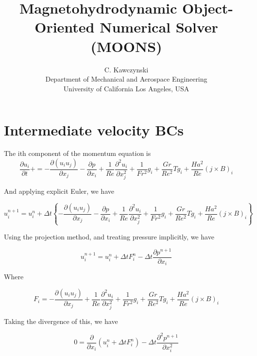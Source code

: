 \documentclass[11pt]{article}
\begin{document}
\doublespacing
\title{Magnetohydrodynamic Object-Oriented Numerical Solver (MOONS)}
\author{C. Kawczynski \\
Department of Mechanical and Aerospace Engineering \\
University of California Los Angeles, USA\\
}
\maketitle

\section{Intermediate velocity BCs}
The ith component of the momentum equation is
\begin{equation}
	\frac{\partial u_i}{\partial t} + 
	= 
	- \frac{\partial (u_i u_j)}{\partial x_j}
	- \frac{\partial p}{\partial x_i}
	+ \frac{1}{Re}
	\frac{\partial^2 u_i}{\partial x_j^2}
	+ \frac{1}{Fr^2}
	g_i
	+ \frac{Gr}{Re^2}
	T g_i
	+ \frac{Ha^2}{Re}
	(j \times B)_i
\end{equation}

And applying explicit Euler, we have

\begin{equation}
	u_i^{n+1}
	=
	u_i^n
	+
	\Delta t
	\left\{
	- \frac{\partial (u_i u_j)}{\partial x_j}
	- \frac{\partial p}{\partial x_i}
	+ \frac{1}{Re}
	\frac{\partial^2 u_i}{\partial x_j^2}
	+ \frac{1}{Fr^2}
	g_i
	+ \frac{Gr}{Re^2}
	T g_i
	+ \frac{Ha^2}{Re}
	(j \times B)_i
	\right\}
\end{equation}

Using the projection method, and treating pressure implicitly, we have

\begin{equation}
	u_i^{n+1}
	=
	u_i^n
	+
	\Delta t
	F_i^n
	-
	\Delta t
	\frac{\partial p^{n+1}}{\partial x_i}
\end{equation}

Where

\begin{equation}
	F_i
	=
	- \frac{\partial (u_i u_j)}{\partial x_j}
	+ \frac{1}{Re}
	\frac{\partial^2 u_i}{\partial x_j^2}
	+ \frac{1}{Fr^2}
	g_i
	+ \frac{Gr}{Re^2}
	T g_i
	+ \frac{Ha^2}{Re}
	(j \times B)_i
\end{equation}

Taking the divergence of this, we have

\begin{equation}
	0
	=
	\frac{\partial }{\partial x_i}
	\left(
	u_i^n
	+
	\Delta t
	F_i^n
	\right)
	-
	\Delta t
	\frac{\partial^2 p^{n+1}}{\partial x_i^2}
\end{equation}
\end{document}
